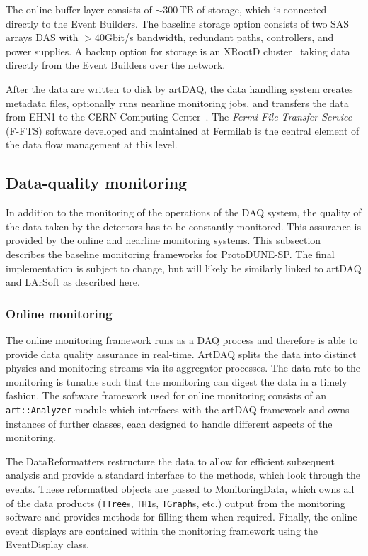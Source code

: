 The online buffer layer consists of $\sim$300\,TB of storage,
which is connected directly to the Event Builders.  The baseline
storage option consists of two SAS arrays DAS with $>40$Gbit/s bandwidth,
redundant paths, controllers, and power supplies.
A backup option for storage is an XRootD cluster~\cite{xrootd} taking
data directly from the Event Builders over the network.

After the data are written to disk by artDAQ, the data handling
system creates metadata files, optionally  runs nearline monitoring jobs, and
transfers the data from EHN1 to the CERN Computing Center~\cite{docdb1212}.
The \textit{Fermi File Transfer Service} (F-FTS) software 
developed and maintained at Fermilab is the central element
of the data flow management at this level.


\subsection{Data-quality monitoring}

In addition to the monitoring of the operations of the DAQ system, the
quality of the data taken by the detectors has to be constantly monitored.
This assurance is provided by the online and nearline monitoring systems.
This subsection describes the baseline monitoring frameworks for ProtoDUNE-SP.  
The final implementation is subject to change, but will likely be similarly
linked to artDAQ and LArSoft as described here.

\subsubsection{Online monitoring}

The online monitoring framework runs as a DAQ process and therefore is
able to provide data quality assurance in real-time. ArtDAQ splits the  
data into distinct physics and monitoring streams via its aggregator processes.  
The data rate to the monitoring is tunable such that the monitoring 
can digest the data in a timely fashion.
The software framework used for online monitoring 
consists of an
\texttt{art::Analyzer} module which interfaces with the artDAQ framework and
owns instances of further classes, each designed to handle different aspects
of the monitoring.  

The DataReformatters restructure the data to allow for efficient subsequent
analysis and provide a standard interface to the methods, which look through
the events.  These reformatted objects are passed to MonitoringData, which
owns all of the data products (\texttt{TTree}s, \texttt{TH1}s, \texttt{TGraph}s,
etc.) output from the monitoring software and provides methods for filling
them when required.  Finally, the online event displays are
contained within the monitoring framework using the EventDisplay class.

